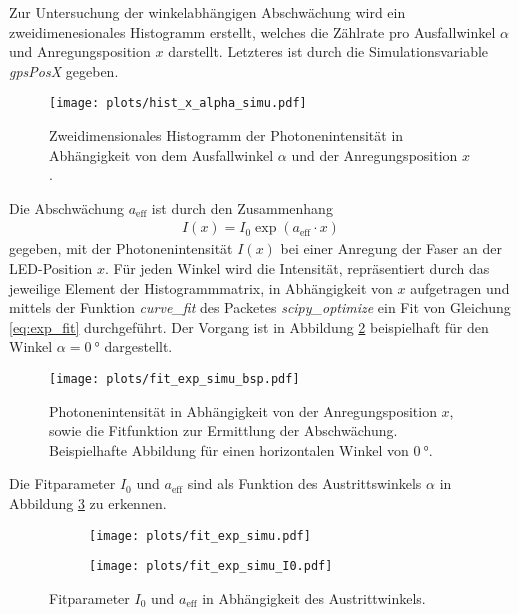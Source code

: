 Zur Untersuchung der winkelabhängigen Abschwächung wird ein zweidimenesionales Histogramm erstellt, welches die Zählrate pro Ausfallwinkel $\alpha$ und Anregungsposition $x$ darstellt. Letzteres ist durch die Simulationsvariable \textit{gpsPosX} gegeben.
\begin{figure}
    \centering
    \texttt{[image: plots/hist\_x\_alpha\_simu.pdf]}
    \caption{Zweidimensionales Histogramm der Photonenintensität in Abhängigkeit von dem Ausfallwinkel $\alpha$ und der Anregungsposition $x$. }
    \label{fig:hist_x_alpha_simu}
\end{figure}
\FloatBarrier
Die Abschwächung $a_\mathrm{eff}$ ist durch den Zusammenhang 
\begin{align}
    I(x) = I_{0} \exp(a_\mathrm{eff} \cdot x)
    \label{eq:exp_fit}
\end{align}
gegeben, mit der Photonenintensität $I(x)$ bei einer Anregung der Faser an der LED-Position $x$. 
Für jeden Winkel wird die Intensität, repräsentiert durch das jeweilige Element der Histogrammmatrix, in Abhängigkeit von $x$ aufgetragen und mittels der Funktion \textit{curve\_fit} des Packetes \textit{scipy\_optimize}  ein Fit von Gleichung \ref{eq:exp_fit} durchgeführt. Der Vorgang ist in Abbildung \ref{fig:fit_exp_simu_bsp} beispielhaft für den Winkel $\alpha = \SI{0}{°}$ dargestellt.
\begin{figure}
    \centering
    \texttt{[image: plots/fit\_exp\_simu\_bsp.pdf]}
    \caption{Photonenintensität in Abhängigkeit von der Anregungsposition $x$, sowie die Fitfunktion zur Ermittlung der Abschwächung. Beispielhafte Abbildung für einen horizontalen Winkel von $\SI{0}{°}$.}
    \label{fig:fit_exp_simu_bsp}
\end{figure}
\FloatBarrier
Die Fitparameter $I_0$ und $a_\mathrm{eff}$ sind als Funktion des Austrittswinkels $\alpha$ in Abbildung \ref{fig:fit_exp_simu} zu erkennen.
\begin{figure}
    \begin{subfigure}[c]{0.5\textwidth}    
        \texttt{[image: plots/fit\_exp\_simu.pdf]}
    \end{subfigure}
    \begin{subfigure}[c]{0.5\textwidth}
        \texttt{[image: plots/fit\_exp\_simu\_I0.pdf]}
    \end{subfigure}
    \caption{Fitparameter $I_0$ und $a_\mathrm{eff}$ in Abhängigkeit des Austrittwinkels.}
    \label{fig:fit_exp_simu}
\end{figure}

